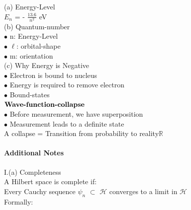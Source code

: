 \documentclass[a4paper, 10pt, onepage]{elegantbook}
\begin{document}
{    (a) Energy-Level \\

    $E_n$ = - $\frac{13.6}{n^2}$ eV \\
 
    (b) Quantum-number  \\
                                                                                                 
    $\bullet$ n: Energy-Level  \\
  
    $\bullet$ $\ell$: orbital-shape \\
 
    $\bullet$ m: orientation \\
 
    (c) Why Energy is Negative  \\
  
    $\bullet$ Electron is bound to nucleus  \\
  
    $\bullet$ Energy is required to remove electron   \\
 
    $\bullet$ Bound-states \\

$\mathbf{\textbf{Wave-function-collapse\index{Wave-function-collapse}}}$   \\
 
$\bullet$ Before measurement, we have superposition  \\
  
$\bullet$ Measurement leads to a definite state  \\

A collapse = Transition from probability to reality$\mathbb R$


\paragraph{Additional Notes}
\noindent

I.(a) Completeness  \\

A Hilbert space is complete if:  \\

    Every Cauchy sequence $\psi_n$ $\subset$ $\mathscr H$ converges to a limit in $\mathscr H$  \\
  
Formally:  \\
  
}
\end{document}
